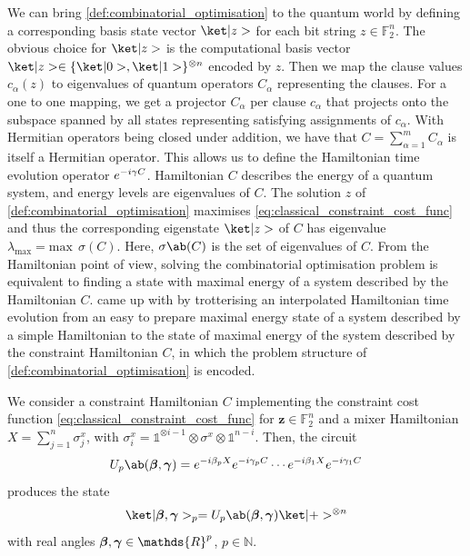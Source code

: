 We can bring \cref{def:combinatorial_optimisation} to the quantum world by defining a corresponding basis state vector $\ket|z>$ for each bit string $z \in \mathds{F}_2^n$. The obvious choice for $\ket|z>$ is the computational basis vector $\ket|z> \in \{\ket|0>, \ket|1>\}^{\otimes n}$ encoded by $z$. Then we map the clause values $c_\alpha(z)$ to eigenvalues of quantum operators $C_\alpha$ representing the clauses. For a one to one mapping, we get a projector $C_\alpha$ per clause $c_\alpha$ that projects onto the subspace spanned by all states representing satisfying assignments of $c_\alpha$. With Hermitian operators being closed under addition, we have that $C = \sum_{\alpha = 1}^m C_\alpha$ is itself a Hermitian operator. This allows us to define the Hamiltonian time evolution operator $e^{-i \gamma C}$. Hamiltonian $C$ describes the energy of a quantum system, and energy levels are eigenvalues of $C$. The solution $z$ of \cref{def:combinatorial_optimisation} maximises \cref{eq:classical_constraint_cost_func} and thus the corresponding eigenstate $\ket|z>$ of $C$ has eigenvalue $\lambda_\text{max} = \text{max} \:\: \sigma (C)$. Here, $\sigma\ab(C)$ is the set of eigenvalues of $C$. From the Hamiltonian point of view, solving the combinatorial optimisation problem is equivalent to finding a state with maximal energy of a system described by the Hamiltonian $C$. \citeauthor{farhi2014quantum} came up with \QAOA by trotterising an interpolated Hamiltonian time evolution from an easy to prepare maximal energy state of a system described by a simple Hamiltonian to the state of maximal energy of the system described by the constraint Hamiltonian $C$, in which the problem structure of \cref{def:combinatorial_optimisation} is encoded. 

\begin{definition}
  \label{def:qaoa_circuit}
    We consider a constraint Hamiltonian $C$ implementing the constraint cost function \cref{eq:classical_constraint_cost_func} for $\bm{z} \in \mathds{F}_2^n$ and a mixer Hamiltonian $X = \sum_{j = 1}^n \sigma_j^x$, with $\sigma_i^x = \mathds{1}^{\otimes i - 1} \otimes \sigma^x \otimes \mathds{1}^{n - i} $. Then, the \QAOA circuit
  \begin{equation}
    \label{eq:qaoa_circuit}
      U_p \ab(\bm{\mangle}, \bm{\pangle}) = e^{-i \mangle_p X} e^{-i \pangle_p C} \cdots e^{-i \mangle_1 X} e^{-i \pangle_1 C}
  \end{equation}
  produces the state
  \begin{equation}
    \label{eq:qaoa_state}
    \ket|\bm{\mangle}, \bm{\pangle}>_p = U_p \ab(\bm{\mangle}, \bm{\pangle}) \ket|+>^{\otimes n}
  \end{equation}
  with real angles $\bm{\mangle}, \bm{\pangle} \in \mathds{R}^p$, $p \in \mathds{N}$.
\end{definition}

